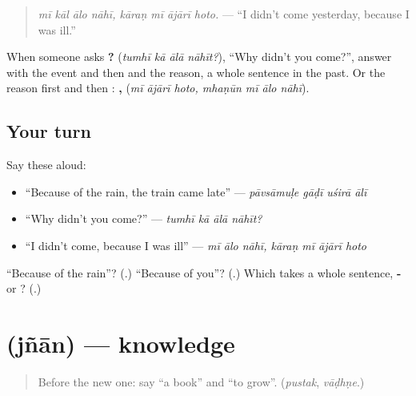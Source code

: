 \begin{quote}
\emph{mī kāl ālo nāhī, kāraṇ mī ājārī hoto.} — \textquotedblleft{}I didn't come yesterday, because I was ill.\textquotedblright{}
\end{quote}

When someone asks \textbf{   ?} (\emph{tumhī kā ālā nāhīt?}), \textquotedblleft{}Why didn't you come?\textquotedblright{}, answer with the event and then \textbf{} and the reason, a whole sentence in the past. Or the reason first and then \textbf{}: \textbf{  ,    } (\emph{mī ājārī hoto, mhaṇūn mī ālo nāhī}).

\subsection*{Your turn}
Say these aloud:

\begin{itemize}
\raggedright
  \item \textquotedblleft{}Because of the rain, the train came late\textquotedblright{} — \emph{pāvsāmuḷe gāḍī uśirā ālī}
  \item \textquotedblleft{}Why didn't you come?\textquotedblright{} — \emph{tumhī kā ālā nāhīt?}
  \item \textquotedblleft{}I didn't come, because I was ill\textquotedblright{} — \emph{mī ālo nāhī, kāraṇ mī ājārī hoto}
\end{itemize}

\begin{tcolorbox}[breakable,colback=teal!4,colframe=teal!35!black,title={Before you move on}]
\textquotedblleft{}Because of the rain\textquotedblright{}? (\textbf{}.) \textquotedblleft{}Because of you\textquotedblright{}? (\textbf{}.) Which takes a whole sentence, \textbf{-} or \textbf{}? (\textbf{}.)
\end{tcolorbox}
\section[\texorpdfstring{\mr{ज्ञान} (jñān)}{ज्ञान (jñān)}]{ (jñān) — knowledge}

\label{lesson:MR-C281-jnan}



\begin{quote}
Before the new one: say \textquotedblleft{}a book\textquotedblright{} and \textquotedblleft{}to grow\textquotedblright{}. (\emph{pustak}, \emph{vāḍhṇe}.)
\end{quote}

